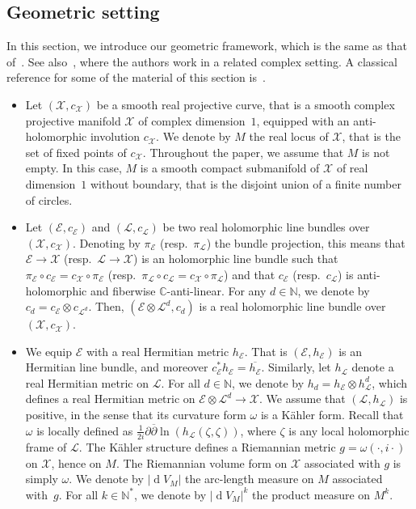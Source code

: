 \documentclass[10pt]{amsart}
\theoremstyle{definition}\newtheorem{defi}[theo]{Definition}\newtheorem{rema}[theo]{Remark}\newtheorem{exam}[theo]{Example}\newtheorem{exem}[theo]{Example}\newtheorem{nota}[theo]{Notation}
\DeclareMathOperator{\dmesure}{d}
\newcommand{\E}{\mathcal{E}}
\newcommand{\X}{\mathcal{X}}
\renewcommand{\L}{\mathcal{L}}
\newcommand{\C}{\mathbb{C}}
\newcommand{\N}{\mathbb{N}}
\newcommand{\debar}{\overline{\partial}}
\newcommand{\norm}[1]{\left\lvert #1 \right\rvert}
\newcommand{\rmes}[1]{\norm{\dmesure\! V_{#1}}}
\renewcommand{\bar}{\overline}
\begin{document}
\subsection{Geometric setting}\label{subsec geometric setting}

In this section, we introduce our geometric framework, which is the same as that of~\cite{Anc2019,GW2016,Let2016,Let2019,LP2019}. See also~\cite{BSZ2000a,SZ1999,SZ2010}, where the authors work in a related complex setting. A classical reference for some of the material of this section is~\cite{GH1994}.
\begin{itemize}
\item Let $(\X,c_{\X})$ be a smooth real projective curve, that is a smooth complex projective manifold $\X$ of complex dimension~$1$, equipped with an anti-holomorphic involution $c_{\X}$. We denote by $M$ the real locus of $\X$, that is the set of fixed points of $c_\X$. Throughout the paper, we assume that $M$ is not empty. In this case, $M$ is a smooth compact submanifold of $\X$ of real dimension~$1$ without boundary, that is the disjoint union of a finite number of circles.

\item Let $(\E,c_\E)$ and $(\L,c_\L)$ be two real holomorphic line bundles over $(\X,c_\X)$. Denoting by $\pi_\E$ (resp.~$\pi_\L$) the bundle projection, this means that $\E \to \X$ (resp.~$\L \to \X$) is an holomorphic line bundle such that $\pi_\E \circ c_\E = c_\X \circ \pi_\E$ (resp.~$\pi_\L \circ c_\L = c_\X \circ \pi_\L$) and that $c_\E$ (resp.~$c_\L$) is anti-holomorphic and fiberwise $\C$-anti-linear. For any $d \in \N$, we denote by $c_d = c_\E \otimes c_{\L^d}$. Then, $(\E \otimes \L^d,c_d)$ is a real holomorphic line bundle over $(\X,c_\X)$.

\item We equip $\E$ with a real Hermitian metric $h_\E$. That is $(\E,h_\E)$ is an Hermitian line bundle, and moreover $c_\E^*h_\E = \bar{h_\E}$. Similarly, let $h_\L$ denote a real Hermitian metric on $\L$. For all $d \in \N$, we denote by $h_d = h_\E \otimes h_\L^d$, which defines a real Hermitian metric on $\E \otimes \L^d \to \X$. We assume that $(\L,h_\L)$ is positive, in the sense that its curvature form $\omega$ is a K\"ahler form. Recall that $\omega$ is locally defined as $\tfrac{1}{2i}\partial\debar \ln(h_\L(\zeta,\zeta))$, where $\zeta$ is any local holomorphic frame of $\L$. The K\"ahler structure defines a Riemannian metric $g = \omega(\cdot,i\cdot)$ on $\X$, hence on $M$. The Riemannian volume form on $\X$ associated with $g$ is simply $\omega$. We denote by $\rmes{M}$ the arc-length measure on $M$ associated with~$g$. For all $k \in \N^*$, we denote by $\rmes{M}^k$ the product measure on $M^k$.


\end{itemize}
\end{document}
